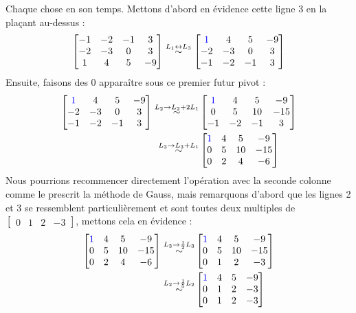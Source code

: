 \noindent Chaque chose en son temps. Mettons d'abord en évidence cette ligne 3 en la plaçant au-dessus :
$$\begin{bmatrix}
-1 & -2 & -1 & 3 \\
-2 & -3 &  0 & 3 \\
1  &  4 &  5 & -9
\end{bmatrix}
\overset{L_1 \leftrightarrow L_3}{\sim} 
\begin{bmatrix}
\color{blue}1  &  4 &  5 & -9\\
-2 & -3 &  0 & 3 \\
-1 & -2 & -1 & 3 
\end{bmatrix}
$$
Ensuite, faisons des $0$ apparaître sous ce premier futur pivot :
\begin{align*}
\begin{bmatrix}
\color{blue}1  &  4 &  5 & -9\\
-2 & -3 &  0 & 3 \\
-1 & -2 & -1 & 3 
\end{bmatrix}
\overset{L_2 \to L_2 + 2L_1}{\sim}
&\begin{bmatrix}
\color{blue}1  &  4 &  5 & -9\\
0 & 5 &  10 & -15 \\
-1 & -2 & -1 & 3 
\end{bmatrix}\\
\overset{L_3 \to L_3 + L_1}{\sim}
&\begin{bmatrix}
\color{blue}1  &  4 &  5 & -9\\
0 & 5 &  10 & -15 \\
0 & 2 & 4 & -6 
\end{bmatrix}
\end{align*}
Nous pourrions recommencer directement l'opération avec la seconde colonne comme le prescrit la méthode de Gauss, mais remarquons d'abord que les lignes 2 et 3 se ressemblent particulièrement et sont toutes deux multiples de $\begin{bmatrix}
0 & 1 & 2 & -3
\end{bmatrix}$, mettons cela en évidence :
\begin{align*}
\begin{bmatrix}
\color{blue}1  &  4 &  5 & -9\\
0 & 5 &  10 & -15 \\
0 & 2 & 4 & -6 
\end{bmatrix}
\overset{L_3 \to \frac{1}{2}L_3}{\sim}
&\begin{bmatrix}
\color{blue}1  &  4 &  5 & -9\\
0 & 5 &  10 & -15 \\
0 & 1 & 2 & -3 
\end{bmatrix}\\
\overset{L_2 \to \frac{1}{5}L_2}{\sim}
&\begin{bmatrix}
\color{blue}1  &  4 &  5 & -9\\
0 & 1 & 2 & -3 \\
0 & 1 & 2 & -3 
\end{bmatrix}
\end{align*}
